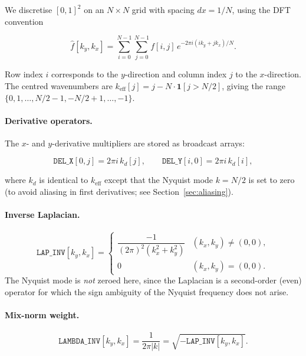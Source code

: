 \documentclass[12pt,a4paper]{article}
\theoremstyle{definition}
\theoremstyle{plain}
\begin{document}
We discretise $[0,1]^2$ on an $N\times N$ grid with spacing $dx = 1/N$,
using the DFT convention

\begin{equation}
  \hat f[k_y,k_x]
  = \sum_{i=0}^{N-1}\sum_{j=0}^{N-1} f[i,j]\,e^{-2\pi i(ik_y+jk_x)/N}.
\end{equation}

Row index $i$ corresponds to the $y$-direction and column index $j$ to the
$x$-direction.
The centred wavenumbers are
$k_{\text{eff}}[j] = j - N\cdot\mathbf{1}[j>N/2]$,
giving the range $\{0,1,\ldots,N/2-1,-N/2+1,\ldots,-1\}$.

\paragraph{Derivative operators.}
The $x$- and $y$-derivative multipliers are stored as broadcast arrays:

\begin{equation}
  \texttt{DEL\_X}[0,j] = 2\pi i\,k_d[j],\qquad
  \texttt{DEL\_Y}[i,0] = 2\pi i\,k_d[i],
\end{equation}

where $k_d$ is identical to $k_{\text{eff}}$ except that the Nyquist mode
$k = N/2$ is set to zero (to avoid aliasing in first derivatives; see
Section~\ref{sec:aliasing}).

\paragraph{Inverse Laplacian.}
\begin{equation}
  \texttt{LAP\_INV}[k_y,k_x]
  = \begin{cases}
      \dfrac{-1}{(2\pi)^2(k_x^2+k_y^2)} & (k_x,k_y)\neq(0,0),\\[6pt]
      0 & (k_x,k_y)=(0,0).
    \end{cases}
\end{equation}
The Nyquist mode is \emph{not} zeroed here, since the Laplacian is a
second-order (even) operator for which the sign ambiguity of the Nyquist
frequency does not arise.

\paragraph{Mix-norm weight.}
\begin{equation}
  \texttt{LAMBDA\_INV}[k_y,k_x]
  = \frac{1}{2\pi|k|}
  = \sqrt{-\texttt{LAP\_INV}[k_y,k_x]}.
\end{equation}
\end{document}
